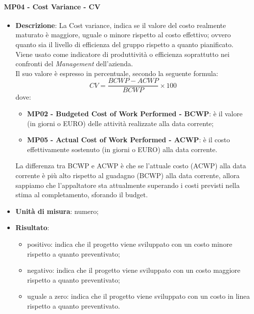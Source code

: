  		\paragraph{MP04 - Cost Variance - CV}
 		\begin{itemize}
 			\item \textbf{Descrizione}:
 			La Cost variance, indica se il valore del costo realmente maturato è maggiore, uguale o minore rispetto al costo effettivo; ovvero quanto sia il livello di efficienza del gruppo rispetto a quanto pianificato. \\
 			Viene usato come indicatore di produttività o efficienza soprattutto nei confronti del {\itshape Management} dell'azienda. \\
 			Il suo valore è espresso in percentuale, secondo la seguente formula:
 			\begin{displaymath}
 				CV = \frac{BCWP - ACWP}{BCWP}\times100
 			\end{displaymath}
 			dove:
 			\begin{itemize}
 				\item {\bfseries MP02 - Budgeted Cost of Work Performed - BCWP}: è il valore (in giorni o EURO) delle attività realizzate alla data corrente;
 				\item {\bfseries MP05 - Actual Cost of Work Performed - ACWP}: è il costo effettivamente sostenuto (in giorni o EURO) alla data corrente.
 			\end{itemize}
 			La differenza tra BCWP e ACWP è che se l'attuale costo (ACWP) alla data corrente è più alto rispetto al guadagno (BCWP) alla data corrente, allora sappiamo che l'appaltatore sta attualmente superando i costi previsti nella stima al completamento, sforando il budget.
 			\item \textbf{Unità di misura}: numero;
 			\item \textbf{Risultato}:
 			\begin{itemize}
 				\item positivo: indica che il progetto viene sviluppato con un costo minore rispetto a quanto preventivato;
 				\item negativo:  indica che il progetto viene sviluppato con un costo maggiore rispetto a quanto preventivato;
 				\item uguale a zero: indica che il progetto viene sviluppato con un costo in linea rispetto a quanto preventivato. \\
 			\end{itemize}
 		\end{itemize}

